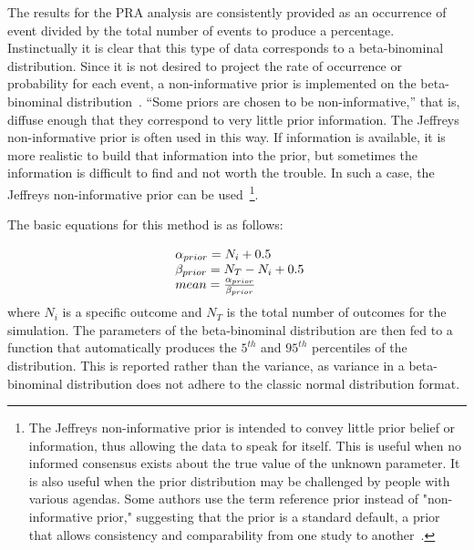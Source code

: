 The results for the PRA analysis are consistently provided as an occurrence of event 
divided by the total number of events to produce a percentage. Instinctually it is 
clear that this type of data corresponds to a beta-binominal distribution.  
Since it is not desired to project the rate of occurrence or probability for each event,
 a non-informative prior is implemented on the beta-binominal distribution~\cite{stat}.
``Some priors are chosen to be non-informative,'' that is, diffuse enough that they correspond 
to very little prior information. The Jeffreys non-informative prior is often used in this way. 
If information is available, it is more realistic to build that information into the prior, 
but sometimes the information is difficult to find and not worth the trouble. 
In such a case, the Jeffreys non-informative prior can be used~\cite{NUREGCR6823}\footnote{The Jeffreys 
non-informative prior is intended to convey little prior belief or information, 
thus allowing the data to speak for itself. This is useful when no informed consensus exists 
about the true value of the unknown parameter. It is also useful when the prior distribution 
may be challenged by people with various agendas. Some authors use the term reference prior 
instead of "non-informative prior," suggesting that the prior is a standard default, a prior 
that allows consistency and comparability from one study to another~\cite{NUREGCR6823}.}.

The basic equations for this method is as follows:

\begin{equation}
  \begin{array}{l@{}l}
    \alpha_{prior} = N_i + 0.5                     \\
    \beta_{prior} = N_T - N_i + 0.5                \\
    mean = \frac{\alpha_{prior}}{\beta_{prior}}
  \label{eq:priorDef}
  \end{array}
\end{equation}
where $N_i$ is a specific outcome and $N_T$ is the total number of outcomes for the simulation. 
The parameters of the beta-binominal distribution are then fed to a function that automatically 
produces the $5^{th}$ and $95^{th}$ percentiles of the distribution.  This is reported rather than the 
variance, as variance in a beta-binominal distribution does not adhere to the classic normal 
distribution format.

